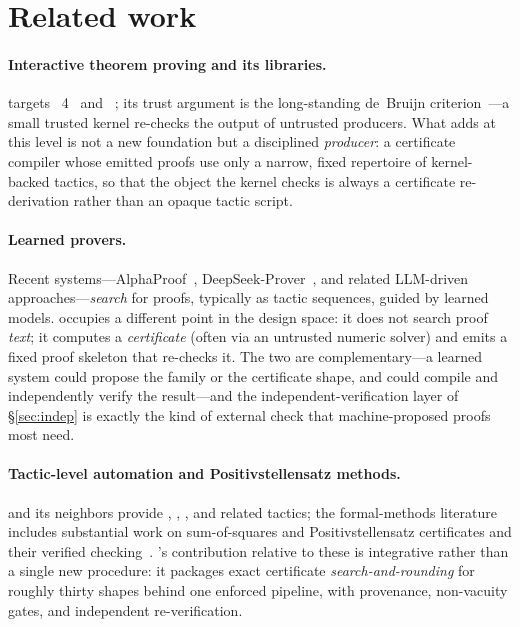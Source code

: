 \section{Related work}
\label{sec:related}

\paragraph{Interactive theorem proving and its libraries.} \Telperion{} targets
\Lean~4~\cite{lean4} and \Mathlib~\cite{mathlib}; its trust argument is the
long-standing de~Bruijn criterion~\cite{debruijn}---a small trusted kernel
re-checks the output of untrusted producers. What \Telperion{} adds at this level
is not a new foundation but a disciplined \emph{producer}: a certificate compiler
whose emitted proofs use only a narrow, fixed repertoire of kernel-backed tactics,
so that the object the kernel checks is always a certificate re-derivation rather
than an opaque tactic script.

\paragraph{Learned provers.} Recent systems---AlphaProof~\cite{alphaproof},
DeepSeek-Prover~\cite{deepseekprover}, and related LLM-driven approaches---\emph{search}
for proofs, typically as tactic sequences, guided by learned models. \Telperion{}
occupies a different point in the design space: it does not search proof \emph{text};
it computes a \emph{certificate} (often via an untrusted numeric solver) and emits a
fixed proof skeleton that re-checks it. The two are complementary---a learned system
could propose the family or the certificate shape, and \Telperion{} could compile
and independently verify the result---and the independent-verification layer of
\S\ref{sec:indep} is exactly the kind of external check that machine-proposed proofs
most need.

\paragraph{Tactic-level automation and Positivstellensatz methods.} \Lean{} and its
neighbors provide , , , and related
tactics; the formal-methods literature includes substantial work on
sum-of-squares and Positivstellensatz certificates and their verified
checking~\cite{positivstellensatz}. \Telperion's contribution relative to these is
integrative rather than a single new procedure: it packages exact certificate
\emph{search-and-rounding} for roughly thirty shapes behind one enforced pipeline,
with provenance, non-vacuity gates, and independent re-verification.

